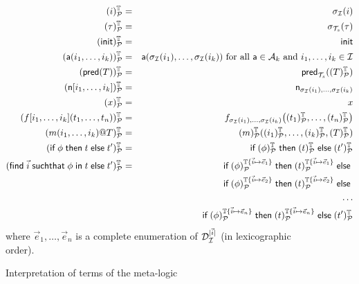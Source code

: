 
\begin{figure}[t]
  \begin{eqnarray*}
    (i)^{\mathbb{T}}_{\mathcal{P}} &=& \sigma_{\mathcal{I}}(i)
    \\
    (\tau)^{\mathbb{T}}_{\mathcal{P}} &=& \sigma_{\mathcal{T}_s}(\tau) \\
    (\mathsf{init})^{\mathbb{T}}_{\mathcal{P}} &=& \mathsf{init} \\
    (\textsf{a}(i_1,\ldots,i_k))^{\mathbb{T}}_{\mathcal{P}} &=&
      \textsf{a}(\sigma_{\mathcal{I}}(i_1),\ldots,\sigma_{\mathcal{I}}(i_k))
      \text{ for all }
      \textsf{a}\in\mathcal{A}_k \text{ and } i_1,\ldots,i_k\in \mathcal{I} \\
    (\textsf{pred}(T))^{\mathbb{T}}_{\mathcal{P}} &=&
      \mathsf{pred}_{\mathcal{T}_s}((T)^{\mathbb{T}}_{\mathcal{P}})
    \\
    (\mathsf{n}[i_1,\ldots,i_k])^{\mathbb{T}}_{\mathcal{P}} &=&
    \mathsf{n}_{\sigma_{\mathcal{I}}(i_1),\ldots,\sigma_{\mathcal{I}}(i_k)}
    \\
    (x)^{\mathbb{T}}_{\mathcal{P}} &=& x
    \\
    (f[i_1,\ldots,i_k](t_1,\ldots,t_n))^{\mathbb{T}}_{\mathcal{P}} &=&
    f_{\sigma_{\mathcal{I}}(i_1),\ldots,\sigma_{\mathcal{I}}(i_k)}\bigl(
    (t_1)^{\mathbb{T}}_{\mathcal{P}},\ldots,(t_n)^{\mathbb{T}}_{\mathcal{P}}
    \bigr)
    \\
    (m(i_1,\dots,i_k)@T)^{\mathbb{T}}_{\mathcal{P}} &=&
    (m)^{\mathbb{T}}_{\mathcal{P}}((i_1)^{\mathbb{T}}_{\mathcal{P}},\dots,(i_k)^{\mathbb{T}}_{\mathcal{P}},(T)^{\mathbb{T}}_{\mathcal{P}})
    \\
    (\textsf{if}\; \phi \;\textsf{then}\; t \;\textsf{else}\; t')^{\mathbb{T}}_{\mathcal{P}} &=&
    \textsf{if}\; (\phi)^{\mathbb{T}}_{\mathcal{P}} \;\textsf{then}\; (t)^{\mathbb{T}}_{\mathcal{P}} \;\textsf{else}\; (t')^{\mathbb{T}}_{\mathcal{P}}
    \\
    (\textsf{find}\; \vec{i} \;\textsf{suchthat}\; \phi \;\textsf{in}\; t \;\textsf{else}\; t')^{\mathbb{T}}_{\mathcal{P}} &=&
    \textsf{if}\; (\phi)^{\mathbb{T}\{\vec{i}\mapsto\vec{e}_1\}}_{\mathcal{P}}
    \;\textsf{then}\; (t)^{\mathbb{T}\{\vec{i}\mapsto\vec{e}_1\}}_{\mathcal{P}}
    \;\textsf{else}\; \\ & &
    \textsf{if}\; (\phi)^{\mathbb{T}\{\vec{i}\mapsto\vec{e}_2\}}_{\mathcal{P}}
    \;\textsf{then}\; (t)^{\mathbb{T}\{\vec{i}\mapsto\vec{e}_2\}}_{\mathcal{P}}
    \;\textsf{else}\; \\ & & \ldots \\ & &
    \textsf{if}\; (\phi)^{\mathbb{T}\{\vec{i}\mapsto\vec{e}_{n}\}}_{\mathcal{P}}
    \;\textsf{then}\; (t)^{\mathbb{T}\{\vec{i}\mapsto\vec{e}_{n}\}}_{\mathcal{P}}
    \;\textsf{else}\; (t')^{\mathbb{T}}_{\mathcal{P}}
  \end{eqnarray*}
  where $\vec{e}_1, \ldots, \vec{e}_{n}$ is a complete enumeration
  of $\mathcal{D}_{\mathcal{I}}^{|\vec{i}|}$ (in lexicographic order).
  \caption{Interpretation of terms of the meta-logic}
  \label{fig:interpt}
\end{figure}

